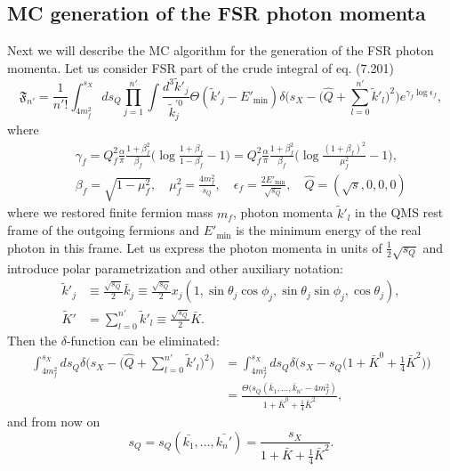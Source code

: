 \subsection{MC generation of the FSR photon momenta}
Next we will describe the MC algorithm for the generation of the FSR photon momenta. Let us consider FSR part of the crude integral of eq. (7.201)
\begin{equation}
\mathfrak{F}_{n'}=\frac{1}{n'!}\int_{4m_f^2}^{s_X}ds_Q\prod_{j=1}^{n'}\int\frac{d^3\widetilde{k}'_j}{\widetilde{k}^{'0}_j}\Theta(\widetilde{k}'_j-E'_\text{min})\delta\biggl(s_X-\biggl(\hat{Q}+\sum_{l=0}^{n'}\widetilde{k}'_l\biggr)^2\biggr)e^{\gamma_f\log\epsilon_f},
\end{equation}
where
\begin{eqnarray}
&&\gamma_f=Q_f^2\frac{\alpha}{\pi}\frac{1+\beta^2_f}{\beta_f}\biggl( \log\frac{1+\beta_f}{1-\beta_f}-1 \biggr)=Q_f^2\frac{\alpha}{\pi}\frac{1+\beta^2_f}{\beta_f}\biggl( \log\frac{(1+\beta_f)^2}{\mu^2_f}-1 \biggr),\nonumber\\
&&\beta_f=\sqrt{1-\mu_f^2},\quad \mu^2_f=\frac{4m_f^2}{s_Q},\quad \epsilon_f=\frac{2E'_\text{min}}{\sqrt{s_Q}},\quad \hat{Q}=(\sqrt{s},0,0,0)
\end{eqnarray}
where  we restored finite fermion mass $m_f$, photon momenta $\widetilde{k}'_l$ in the QMS rest frame of the outgoing fermions and $E'_{\text{min}}$ is the minimum energy of the real photon in this frame. Let us express the photon momenta in units of $\frac{1}{2}\sqrt{s_Q}$ and introduce polar parametrization and other auxiliary notation:
\begin{align}
\widetilde{k}'_j&\equiv\frac{\sqrt{s_Q}}{2}\bar{k}_j\equiv\frac{\sqrt{s_Q}}{2}x_j(1,\sin\theta_j\cos\phi_j,\sin\theta_j\sin\phi_j,\cos\theta_j),\nonumber\\
\widetilde{K}'&=\sum_{l=0}^{n'}\widetilde{k}'_l\equiv\frac{\sqrt{s_Q}}{2}\bar{K}.
\end{align}
Then the $\delta$-function can be eliminated:
\begin{align}
\int_{4m_f^2}^{s_X}ds_Q\delta\biggl(s_X-\biggl(\hat{Q}+\sum_{l=0}^{n'}\widetilde{k}'_l\biggr)^2\biggr)&=\int_{4m_f^2}^{s_X}ds_Q\delta\biggl(s_X-s_Q\biggl(1+\bar{K}^0+\frac{1}{4}\bar{K}^2\biggr)\biggr)\nonumber\\
&=\frac{\Theta(s_Q(\bar{k}_1,\ldots,\bar{k}_{n'}-4m^2_f)}{1+\bar{K}^0+\frac{1}{4}\bar{K}^2},
\end{align}
and from now on
\begin{equation}
s_Q=s_Q(\bar{k_1},\ldots,\bar{k_n'})=\frac{s_X}{1+\bar{K}+\frac{1}{4}\bar{K}^2}.
\end{equation}
